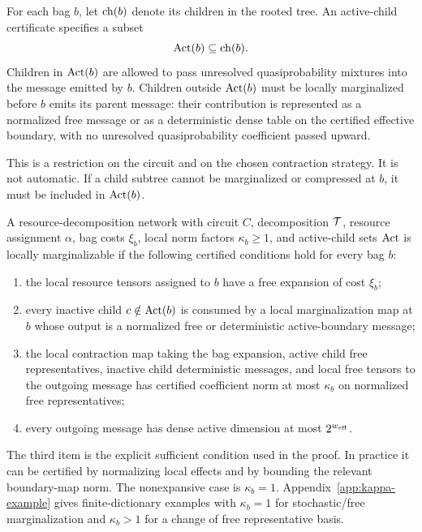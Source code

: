 \begin{definition}
For each bag \(b\), let \(\operatorname{ch}(b)\) denote its children in the rooted tree. An active-child certificate specifies a subset
\[
\operatorname{Act}(b)\subseteq \operatorname{ch}(b).
\]
Children in \(\operatorname{Act}(b)\) are allowed to pass unresolved quasiprobability mixtures into the message emitted by \(b\). Children outside \(\operatorname{Act}(b)\) must be locally marginalized before \(b\) emits its parent message: their contribution is represented as a normalized free message or as a deterministic dense table on the certified effective boundary, with no unresolved quasiprobability coefficient passed upward.
\end{definition}

This is a restriction on the circuit and on the chosen contraction strategy. It is not automatic. If a child subtree cannot be marginalized or compressed at \(b\), it must be included in \(\operatorname{Act}(b)\).

\begin{definition}
\label{def:lm-network}
A resource-decomposition network with circuit \(C\), decomposition \(\mathcal{T}\), resource assignment \(\alpha\), bag costs \(\xi_b\), local norm factors \(\kappa_b\ge 1\), and active-child sets \(\operatorname{Act}\) is locally marginalizable if the following certified conditions hold for every bag \(b\):
\begin{enumerate}[leftmargin=1.2cm]
\item the local resource tensors assigned to \(b\) have a free expansion of cost \(\xi_b\);
\item every inactive child \(c\notin\operatorname{Act}(b)\) is consumed by a local marginalization map at \(b\) whose output is a normalized free or deterministic active-boundary message;
\item the local contraction map taking the bag expansion, active child free representatives, inactive child deterministic messages, and local free tensors to the outgoing message has certified coefficient norm at most \(\kappa_b\) on normalized free representatives;
\item every outgoing message has dense active dimension at most \(2^{w_{\mathrm{eff}}}\).
\end{enumerate}
\end{definition}

The third item is the explicit sufficient condition used in the proof. In practice it can be certified by normalizing local effects and by bounding the relevant boundary-map norm. The nonexpansive case is \(\kappa_b=1\). Appendix~\ref{app:kappa-example} gives finite-dictionary examples with \(\kappa_b=1\) for stochastic/free marginalization and \(\kappa_b>1\) for a change of free representative basis.

